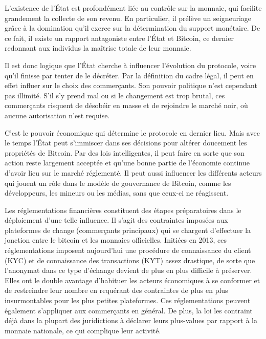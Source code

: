 L'existence de l'État est profondément liée au contrôle sur la monnaie, qui facilite grandement la collecte de son revenu. En particulier, il prélève un seigneuriage grâce à la domination qu'il exerce sur la détermination du support monétaire. De ce fait, il existe un rapport antagoniste entre l'État et Bitcoin, ce dernier redonnant aux individus la maîtrise totale de leur monnaie. %

Il est donc logique que l'État cherche à influencer l'évolution du protocole, voire qu'il finisse par tenter de le décréter. Par la définition du cadre légal, il peut en effet influer sur le choix des commerçants. Son pouvoir politique n'est cependant pas illimité. S'il s'y prend mal ou si le changement est trop brutal, ces commerçants risquent de désobéir en masse et de rejoindre le marché noir, où aucune autorisation n'est requise.

C'est le pouvoir économique qui détermine le protocole en dernier lieu. Mais avec le temps l'État peut s'immiscer dans ses décisions pour altérer doucement les propriétés de Bitcoin. Par des lois intelligentes, il peut faire en sorte que son action reste largement acceptée et qu'une bonne partie de l'économie continue d'avoir lieu sur le marché réglementé. Il peut aussi influencer les différents acteurs qui jouent un rôle dans le modèle de gouvernance de Bitcoin, comme les développeurs, les mineurs ou les médias, sans que ceux-ci ne réagissent.

Les réglementations financières constituent des étapes préparatoires dans le déploiement d'une telle influence. Il s'agit des contraintes imposées aux plateformes de change (commerçants principaux) qui se chargent d'effectuer la jonction entre le bitcoin et les monnaies officielles. Initiées en 2013, ces réglementations imposent aujourd'hui une procédure de connaissance du client (KYC) et de connaissance des transactions (KYT) assez drastique, de sorte que l'anonymat dans ce type d'échange devient de plus en plus difficile à préserver. Elles ont le double avantage d'habituer les acteurs économiques à se conformer et de restreindre leur nombre en requérant des contraintes de plus en plus insurmontables pour les plus petites plateformes. Ces réglementations peuvent également s'appliquer aux commerçants en général. De plus, la loi les contraint déjà dans la plupart des juridictions à déclarer leurs plus-values par rapport à la monnaie nationale, ce qui complique leur activité.

